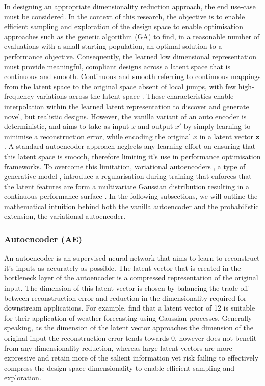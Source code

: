 \documentclass{article}
\begin{document}
In designing an appropriate dimensionality reduction approach, the end use-case must be considered. In the context of this research, the objective is to enable efficient sampling and exploration of the design space to enable optimisation approaches such as the genetic algorithm (GA) to find, in a reasonable number of evaluations with a small starting population, an optimal solution to a performance objective. Consequently, the learned low dimensional representation must provide meaningful, compliant designs across a latent space that is continuous and smooth. Continuous and smooth referring to continuous mappings from the latent space to the original space absent of local jumps, with few high-frequency variations across the latent space \citep{Danhaive2022}. These characteristics enable interpolation within the learned latent representation to discover and generate novel, but realistic designs. However, the vanilla variant of an auto encoder is deterministic, and aims to take as input $x$ and output $x'$ by simply learning to minimise a reconstruction error, while encoding the original $x$ in a latent vector $\textbf{z}$. A standard autoencoder approach neglects any learning effort on ensuring that this latent space is smooth, therefore limiting it's use in performance optimisation frameworks. To overcome this limitation, variational autoencoders \citep{Kingma2013}, a type of generative model \citep{Danhaive2022}, introduce a regularisation during training that enforces that the latent features are form a multivariate Gaussian distribution resulting in a continuous performance surface \citep{Huang2022}. In the following subsections, we will outline the mathematical intuition behind both the vanilla autoencoder and the probabilistic extension, the variational autoencoder.

\subsubsection{Autoencoder (AE)}
An autoencoder is an supervised neural network that aims to learn to reconstruct it's inputs as accurately as possible. The latent vector that is created in the bottleneck layer of the autoencoder is a compressed representation of the original input. The dimension of this latent vector is chosen by balancing the trade-off between reconstruction error and reduction in the dimensionality required for downstream applications. For example, \cite{Donnelly2024} find that a latent vector of 12 is suitable for their application of weather forecasting using Gaussian processes. Generally speaking, as the dimension of the latent vector approaches the dimension of the original input the reconstruction error tends towards 0, however does not benefit from any dimensionality reduction, whereas large latent vectors are more expressive and retain more of the salient information yet risk failing to effectively compress the design space dimensionality to enable efficient sampling and exploration.
\end{document}
